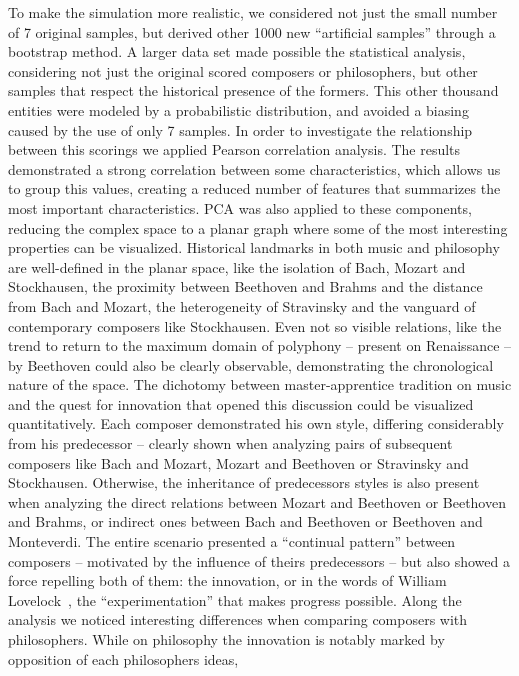 \documentclass[
 aip,
 jmp,
 amsmath,amssymb,
 reprint,
]{revtex4-1}
\begin{document}
To make the simulation more
realistic, we considered not just the small number of 7 original samples, but
derived other 1000 new ``artificial samples'' through a bootstrap
method. A larger data set made possible the statistical analysis,
considering not just the original scored composers or philosophers, but other samples
that respect the historical presence of the formers. This other thousand
entities were modeled by a
probabilistic distribution, and avoided a biasing caused by
the use of only 7 samples.
In order to investigate the
relationship between this scorings we applied Pearson correlation
analysis. The results demonstrated a strong correlation between some
characteristics, which allows us to group this values, creating a
reduced number of features that summarizes the most important
characteristics. PCA was also applied to these components, reducing
the complex space to a planar graph where some of the most interesting
properties can be visualized. 
Historical landmarks in both music and philosophy are
well-defined in the planar space, like the isolation of Bach, Mozart
and Stockhausen, the
proximity between Beethoven and Brahms and the distance from Bach and Mozart, the heterogeneity of
Stravinsky and the vanguard of contemporary composers
like Stockhausen. Even not so visible relations, like the trend to return to the maximum domain of polyphony -- present on Renaissance -- by Beethoven
could also be clearly observable, demonstrating the chronological nature of the
space. 
The dichotomy between
master-apprentice tradition on music and the quest for innovation that
opened this discussion could be visualized quantitatively. Each
composer demonstrated his own style, differing considerably from his
predecessor -- clearly shown when analyzing pairs of subsequent composers like
Bach and Mozart, Mozart and Beethoven or Stravinsky and
Stockhausen. Otherwise, the inheritance of predecessors styles is also
present when analyzing the direct relations between Mozart and
Beethoven or Beethoven and
Brahms, or indirect ones between Bach and Beethoven
or Beethoven and Monteverdi. The entire scenario presented
a ``continual pattern'' between
composers -- motivated by the influence of theirs predecessors -- but also showed a force
repelling both of them: the innovation, or in the words of William
Lovelock~\cite{Lovelock}, the ``experimentation'' that makes progress possible.
Along the analysis we noticed interesting differences when comparing
composers with philosophers. While on philosophy the
innovation is notably marked by opposition of each philosophers ideas,
\end{document}

